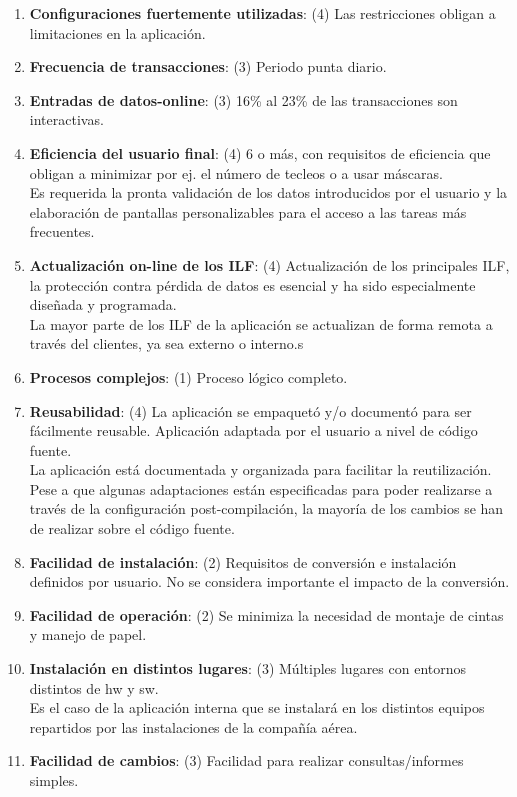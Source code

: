 \documentclass[11pt, a4paper, twoside, titlepage]{article}
\begin{document}
\begin{enumerate}
					\item \textbf{Configuraciones fuertemente utilizadas}: (4) Las restricciones obligan a limitaciones en la
aplicación.
					\item \textbf{Frecuencia de transacciones}: (3) Periodo punta diario.
					\item \textbf{Entradas de datos-online}: (3) 16\% al 23\% de las transacciones son interactivas.
					\item \textbf{Eficiencia del usuario final}: (4) 6 o más, con requisitos de eficiencia que obligan a
minimizar por ej. el número de tecleos o a usar máscaras.\\
						Es requerida la pronta validación de los datos introducidos por el usuario y la elaboración de pantallas personalizables para el acceso a las tareas más frecuentes.
					\item \textbf{Actualización on-line de los ILF}: (4) Actualización de los principales ILF, la protección
contra pérdida de datos es esencial y ha sido especialmente diseñada y programada.\\
						La mayor parte de los ILF de la aplicación se actualizan de forma remota a través del \software clientes, ya sea externo o interno.s
					\item \textbf{Procesos complejos}: (1) Proceso lógico completo.

					\item \textbf{Reusabilidad}: (4) La aplicación se empaquetó y/o documentó para ser fácilmente reusable.
Aplicación adaptada por el usuario a nivel de código fuente.\\
						La aplicación está documentada y organizada para facilitar la reutilización. Pese a que algunas adaptaciones están especificadas para poder realizarse a través de la configuración post-compilación, la mayoría de los cambios se han de realizar sobre el código fuente.
					\item \textbf{Facilidad de instalación}: (2) Requisitos de conversión e instalación definidos por usuario.
No se considera importante el impacto de la conversión.
					\item \textbf{Facilidad de operación}: (2) Se minimiza la necesidad de montaje de cintas y manejo de
papel.
					\item \textbf{Instalación en distintos lugares}: (3) Múltiples lugares con entornos distintos de hw y sw.\\
						Es el caso de la aplicación interna que se instalará en los distintos equipos repartidos por las instalaciones de la compañía aérea.
					\item \textbf{Facilidad de cambios}: (3) Facilidad para realizar consultas/informes simples.	
				\end{enumerate}
\end{document}
